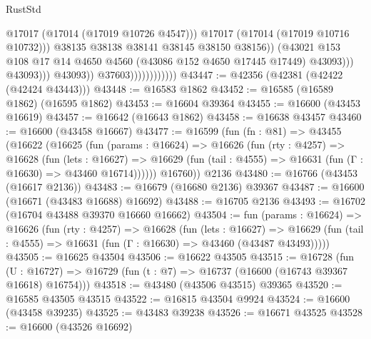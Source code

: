 \begin{lexlean}{RustStd}
\begin{coremodule}
{\begin{coremodule}
{{{{{{{{{{{{{{{{{{{{{{{{{{{{{{{{{{{{{{{{{{{{{{{{{{{{{{{                                                  @17017
                                                  (@17014 (@17019 @10726 @4547)))
                                                @17017
                                                (@17014 (@17019 @10716 @10732)))
                                              @38135
                                              @38138
                                              @38141
                                              @38145
                                              @38150
                                              @38156))
                                          (@43021
                                            @153
                                            @108
                                            @17
                                            @14
                                            @4650
                                            @4560
                                            (@43086 @152 @4650 @17445 @17449)
                                            @43093)))
                                      @43093)))
                                @43093))
                            @37603))))))))))))
@43447 := @42356 (@42381 (@42422 (@42424 @43443)))
@43448 := @16583 @1862
@43452 := @16585 (@16589 @1862) (@16595 @1862)
@43453 := @16604 @39364
@43455 := @16600 (@43453 @16619)
@43457 := @16642 (@16643 @1862)
@43458 := @16638 @43457
@43460 := @16600 (@43458 @16667)
@43477 := @16599
    (fun (fn : @81) =>
    @43455
      (@16622
        (@16625
          (fun (params : @16624) =>
          @16626
            (fun (rty : @4257) =>
            @16628
              (fun (lets : @16627) =>
              @16629 (fun (tail : @4555) => @16631 (fun (Γ : @16630) => @43460 @16714))))))
        @16760))
    @2136
@43480 := @16766 (@43453 (@16617 @2136))
@43483 := @16679 (@16680 @2136) @39367
@43487 := @16600 (@16671 (@43483 @16688) @16692)
@43488 := @16705 @2136
@43493 := @16702 (@16704 @43488 @39370 @16660 @16662)
@43504 := fun (params : @16624) =>
  @16626
    (fun (rty : @4257) =>
    @16628
      (fun (lets : @16627) =>
      @16629 (fun (tail : @4555) => @16631 (fun (Γ : @16630) => @43460 (@43487 @43493)))))
@43505 := @16625 @43504
@43506 := @16622 @43505
@43515 := @16728
    (fun (U : @16727) => @16729 (fun (t : @7) => @16737 (@16600 (@16743 @39367 @16618) @16754)))
@43518 := @43480 (@43506 @43515) @39365
@43520 := @16585 @43505 @43515
@43522 := @16815 @43504 @9924
@43524 := @16600 (@43458 @39235)
@43525 := @43483 @39238
@43526 := @16671 @43525
@43528 := @16600 (@43526 @16692)
}}}}}}}}}}}}}}}}}}}}}}}}}}}}}}}}}}}}}}}}}}}}}}}}}}}}}}}
\end{coremodule}}
\end{coremodule}
\end{lexlean}
